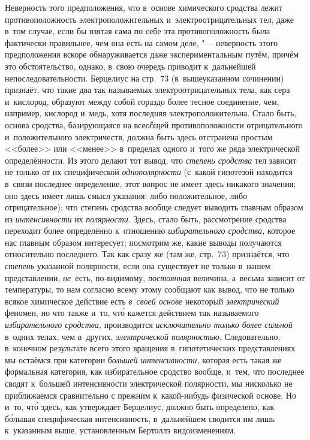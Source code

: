 Неверность того предположения, что в~основе химического сродства лежит
противоположность электроположительных и~электроотрицательных тел, даже в~том
случае, если бы взятая сама по себе эта противоположность была фактически
правильнее, чем она есть на самом деле, "--- неверность этого предположения
вскоре обнаруживается даже экспериментальным путём, причём это обстоятельство,
однако, в~свою очередь приводит к~дальнейшей непоследовательности. Берцелиус на
стр.~73 (в~вышеуказанном сочинении) признаёт, что такие два так называемых
электроотрицательных тела, как сера и~кислород, образуют между собой гораздо
более тесное соединение, чем, например, кислород и~медь, хотя последняя
электроположительна. Стало быть, основа сродства, базирующаяся на всеобщей
противоположности отрицательного и~положительного электричеств, должна быть
здесь отстранена простым <<более>> или <<менее>> в~пределах
одного и~того же ряда электрической определённости. Из этого делают тот вывод,
что {\em степень сродства} тел зависит не только от их специфической
{\em однополярности} (с~какой гипотезой находится в~связи последнее
определение, этот вопрос не имеет здесь никакого значения; оно здесь имеет лишь
смысл указания: либо положительное, либо отрицательное); что
степень сродства вообще следует выводить главным образом из {\em интенсивности} их
{\em полярности}. Здесь, стало быть, рассмотрение сродства переходит
более определённо к~отношению {\em избирательного сродства,} которое нас
главным образом интересует; посмотрим же, какие выводы получаются относительно
последнего. Так как сразу же (там же, стр.~73) признаётся, что {\em степень}
указанной полярности, если она существует не только в~нашем представлении,
{\em не}~есть, по-видимому, {\em постоянная} величина, а~весьма зависит от
температуры, то нам согласно всему этому сообщают как вывод, что не только
всякое химическое действие есть {\em в~своей основе} некоторый
{\em электрический} феномен, но что также и~то, чт\'{о} кажется действием так
называемого {\em избирательного сродства,} производится
{\em исключительно только более сильной} в~одних телах, чем в~других,
{\em электрической полярностью}. Следовательно, в~конечном результате всего этого
вращения в~гипотетических представлениях мы остаёмся при категории
{\em большей интенсивности,} которая есть такая же формальная категория,
как избирательное сродство вообще, и~тем, что последнее сводят к~большей
интенсивности электрической полярности, мы нисколько не приближаемся сравнительно
с прежним к~какой-нибудь физической основе. Но и~то, чт\'{о} здесь, как
утверждает Берцелиус, должно быть определено, как б\'{о}льшая специфическая
интенсивность, в~дальнейшем сводится им лишь к~указанным выше, установленным
Бертоллэ видоизменениям.

